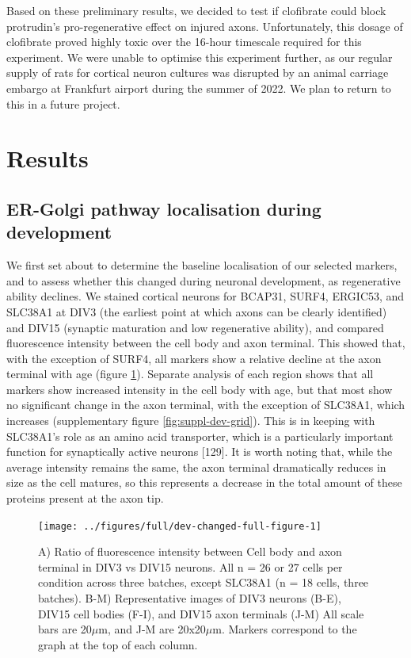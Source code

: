 \documentclass[
  12pt,
  a4paper,
]{book}
\begin{document}
Based on these preliminary results, we decided to test if clofibrate could block protrudin's pro-regenerative effect on injured axons. Unfortunately, this dosage of clofibrate proved highly toxic over the 16-hour timescale required for this experiment. We were unable to optimise this experiment further, as our regular supply of rats for cortical neuron cultures was disrupted by an animal carriage embargo at Frankfurt airport during the summer of 2022. We plan to return to this in a future project.

\hypertarget{results-2}{%
\section{Results}\label{results-2}}

\hypertarget{er-golgi-pathway-localisation-during-development}{%
\subsection{ER-Golgi pathway localisation during development}\label{er-golgi-pathway-localisation-during-development}}

We first set about to determine the baseline localisation of our selected markers, and to assess whether this changed during neuronal development, as regenerative ability declines. We stained cortical neurons for BCAP31, SURF4, ERGIC53, and SLC38A1 at DIV3 (the earliest point at which axons can be clearly identified) and DIV15 (synaptic maturation and low regenerative ability), and compared fluorescence intensity between the cell body and axon terminal. This showed that, with the exception of SURF4, all markers show a relative decline at the axon terminal with age (figure \ref{fig:dev-changed-full-figure}). Separate analysis of each region shows that all markers show increased intensity in the cell body with age, but that most show no significant change in the axon terminal, with the exception of SLC38A1, which increases (supplementary figure \ref{fig:suppl-dev-grid}). This is in keeping with SLC38A1's role as an amino acid transporter, which is a particularly important function for synaptically active neurons {[}129{]}. It is worth noting that, while the average intensity remains the same, the axon terminal dramatically reduces in size as the cell matures, so this represents a decrease in the total amount of these proteins present at the axon tip.

\begin{figure}
\texttt{[image: ../figures/full/dev-changed-full-figure-1]} \caption[Developmental changes in marker localisation in cortical neurons]{A) Ratio of fluorescence intensity between Cell body and axon terminal in DIV3 vs DIV15 neurons.  All n = 26 or 27 cells per condition across three batches, except SLC38A1 (n = 18 cells, three batches). B-M) Representative images of DIV3 neurons (B-E), DIV15 cell bodies (F-I), and DIV15 axon terminals (J-M)  All scale bars are 20$\mu$m, and J-M are 20x20$\mu$m.  Markers correspond to the graph at the top of each column.}\label{fig:dev-changed-full-figure}
\end{figure}
\end{document}
